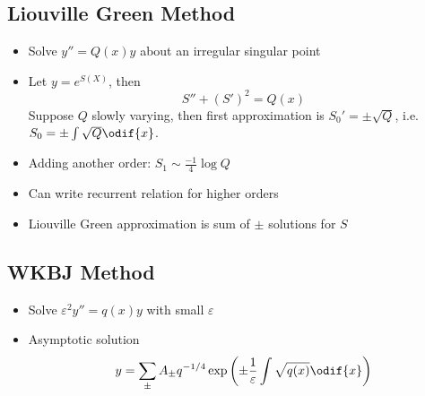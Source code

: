 \subsection{Liouville Green Method}
\begin{itemize}
    \item Solve $y''=Q(x)y$ about an irregular singular point
    \item Let $ y = e^{S(X)}$, then \[S'' +(S')^2 = Q(x)\]
    Suppose $Q$ slowly varying, then first approximation is $S_0' = \pm \sqrt{Q}$, i.e. $S_0 = \pm \int \sqrt{Q} \odif{x}$.
    \item Adding another order: $S_1 \sim \frac{-1}{4}\log Q$
    \item Can write recurrent relation for higher orders
    \item Liouville Green approximation is sum of $\pm$ solutions for $S$
\end{itemize}
\subsection*{WKBJ Method}
\begin{itemize}
    \item Solve $\varepsilon^2 y''=q(x)y$ with small $\varepsilon$
    \item Asymptotic solution \[y = \sum_{\pm} A_{\pm} q^{-1/4}\exp\left( \pm \frac{1}{\varepsilon} \int \sqrt{q(x)} \odif{x}\right)\]
\end{itemize}
